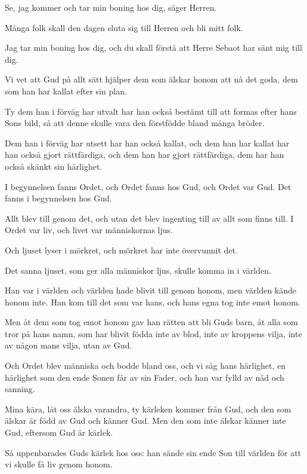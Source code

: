 Se, jag kommer
och tar min boning hos dig,
säger Herren.

Många folk skall den dagen
sluta sig till Herren och bli mitt folk.

Jag tar min boning hos dig, och du skall förstå att Herre Sebaot har sänt mig till dig.

{
Vi vet att Gud på allt sätt hjälper dem som älskar honom att nå det goda, dem som han har kallat efter sin plan.}

Ty dem han i förväg har utvalt har han också bestämt till att formas efter hans Sons bild, så att denne skulle vara den förstfödde bland många bröder.

Dem han i förväg har utsett har han också kallat, och dem han har kallat har han också gjort rättfärdiga, och dem han har gjort rättfärdiga, dem har han också skänkt sin härlighet.


{
I begynnelsen fanns Ordet, och Ordet fanns hos Gud, och Ordet var Gud.
Det fanns i begynnelsen hos Gud.}

Allt blev till genom det, och utan det blev ingenting till av allt som finns till.
I Ordet var liv, och livet var människornas ljus.

Och ljuset lyser i mörkret, och mörkret har inte övervunnit det.

Det sanna ljuset, som ger alla människor ljus, skulle komma in i världen.

Han var i världen och världen hade blivit till genom honom, men världen kände honom inte.
Han kom till det som var hans, och hans egna tog inte emot honom.

Men åt dem som tog emot honom gav han rätten att bli Guds barn, åt alla som tror på hans namn,
som har blivit födda inte av blod, inte av kroppens vilja, inte av någon mans vilja, utan av Gud.

Och Ordet blev människa och bodde bland oss, och vi såg hans härlighet, en härlighet som den ende Sonen får av sin Fader, och han var fylld av nåd och sanning.


{
Mina kära, låt oss älska varandra, ty kärleken kommer från Gud, och den som älskar är född av Gud och känner Gud.}
Men den som inte älskar känner inte Gud, eftersom Gud är kärlek.

Så uppenbarades Guds kärlek hos oss: han sände sin ende Son till världen för att vi skulle få liv genom honom.

